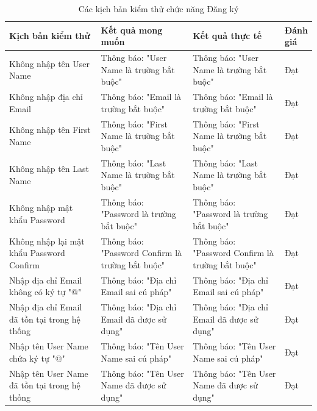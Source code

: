 \documentclass[../DoAn.tex]{subfiles}
\begin{document}
\begin{table}[H]
    \renewcommand{\arraystretch}{1.2}
    \centering{}
    \begin{tabular}{p{0.3\linewidth}p{0.3\linewidth}p{0.3\linewidth}p{0.1\linewidth}}
        \hline
        \textbf{Kịch bản kiểm thử}                   & \textbf{Kết quả mong muốn}                       & \textbf{Kết quả thực tế}                         & \textbf{Đánh giá} \\ \hline
        Không nhập tên User Name                     & Thông báo: "User Name là trường bắt buộc"        & Thông báo: "User Name là trường bắt buộc"        & Đạt               \\ \hline
        Không nhập địa chỉ Email                     & Thông báo: "Email là trường bắt buộc"            & Thông báo: "Email là trường bắt buộc"            & Đạt               \\ \hline
        Không nhập tên First Name                    & Thông báo: "First Name là trường bắt buộc"       & Thông báo: "First Name là trường bắt buộc"       & Đạt               \\ \hline
        Không nhập tên Last Name                     & Thông báo: "Last Name là trường bắt buộc"        & Thông báo: "Last Name là trường bắt buộc"        & Đạt               \\ \hline
        Không nhập mật khẩu Password                 & Thông báo: "Password là trường bắt buộc"         & Thông báo: "Password là trường bắt buộc"         & Đạt               \\ \hline
        Không nhập lại mật khẩu Password Confirm     & Thông báo: "Password Confirm là trường bắt buộc" & Thông báo: "Password Confirm là trường bắt buộc" & Đạt               \\ \hline
        Nhập địa chỉ Email không có ký tự "@"        & Thông báo: "Địa chỉ Email sai cú pháp"           & Thông báo: "Địa chỉ Email sai cú pháp"           & Đạt               \\ \hline
        Nhập địa chỉ Email đã tồn tại trong hệ thống & Thông báo: "Địa chỉ Email đã được sử dụng"       & Thông báo: "Địa chỉ Email đã được sử dụng"       & Đạt               \\ \hline
        Nhập tên User Name chứa ký tự "@"            & Thông báo: "Tên User Name sai cú pháp"           & Thông báo: "Tên User Name sai cú pháp"           & Đạt               \\ \hline
        Nhập tên User Name đã tồn tại trong hệ thống & Thông báo: "Tên User Name đã được sử dụng"       & Thông báo: "Tên User Name đã được sử dụng"       & Đạt               \\ \hline
    \end{tabular}
    \renewcommand{\arraystretch}{1}
    \caption{Các kịch bản kiểm thử chức năng Đăng ký}
    \label{fig:testcase_register}
\end{table}
\end{document}

